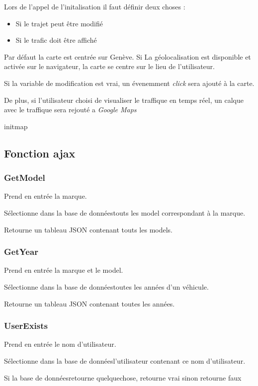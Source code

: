 \documentclass[a4paper]{article}
\newcommand{\gmap}{\emph{Google Maps}}
\newcommand{\bdd}{base de données}
\newcommand{\diag}[1]{}
\begin{document}
Lors de l'appel de l'initalisation il faut définir deux choses :
\begin{itemize}
	\item Si le trajet peut être modifié
	\item Si le trafic doit être affiché
\end{itemize}

Par défaut la carte est centrée sur Genève. Si La géolocalisation est disponible et activée sur le navigateur, la carte se centre sur le lieu de l'utilisateur.

Si la variable de modification est vrai, un évenemment \emph{click} sera ajouté à la carte.

De plus, si l'utilisateur choisi de visualiser le traffique en temps réel, un calque avec le traffique sera rejouté a \gmap


\begin{center}
	\diag{initMap}
	\caption{initmap}
\end{center}


\subsection{Fonction ajax}
\subsubsection{GetModel}
Prend en entrée la marque.

Sélectionne dans la \bdd touts les model correspondant à la marque.

Retourne un tableau JSON contenant touts les models.

\subsubsection{GetYear}	
Prend en entrée la marque et le model.

Sélectionne dans la \bdd toutes les années d'un véhicule.

Retourne un tableau JSON contenant toutes les années.

\subsubsection{UserExists}
Prend en entrée le nom d'utilisateur.

Sélectionne dans la \bdd l'utilisateur contenant ce nom d'utilisateur.

Si la \bdd retourne quelquechose, retourne vrai sinon retourne faux
\end{document}

